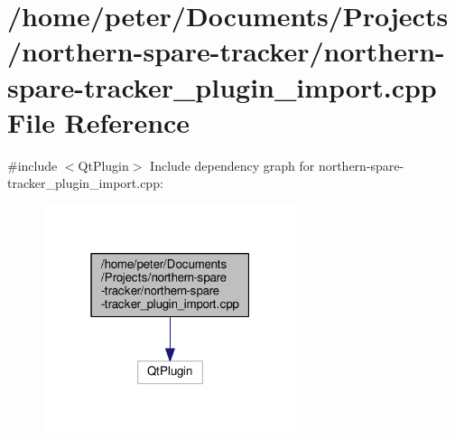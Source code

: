 \hypertarget{northern-spare-tracker__plugin__import_8cpp}{}\section{/home/peter/\+Documents/\+Projects/northern-\/spare-\/tracker/northern-\/spare-\/tracker\+\_\+plugin\+\_\+import.cpp File Reference}
\label{northern-spare-tracker__plugin__import_8cpp}
{\ttfamily \#include $<$Qt\+Plugin$>$}\newline
Include dependency graph for northern-\/spare-\/tracker\+\_\+plugin\+\_\+import.cpp\+:
\nopagebreak
\begin{figure}[H]
\begin{center}
\leavevmode
\includegraphics[width=211pt]{northern-spare-tracker__plugin__import_8cpp__incl}
\end{center}
\end{figure}
